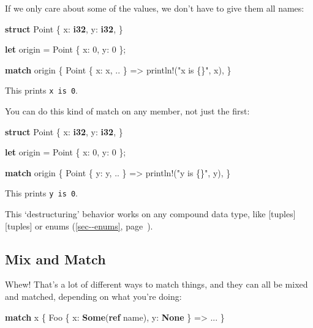 \documentclass[a4paper,]{book}
\renewcommand*{\hyperref}[2][\ar]{%
  \def\ar{#2}%
  #2 (\autoref{#1}, page~\pageref{#1})}
\newenvironment{Shaded}{\begin{snugshade}}{\end{snugshade}}
\newcommand{\KeywordTok}[1]{\textcolor[rgb]{0.13,0.29,0.53}{\textbf{{#1}}}}
\newcommand{\DecValTok}[1]{\textcolor[rgb]{0.00,0.00,0.81}{{#1}}}
\newcommand{\StringTok}[1]{\textcolor[rgb]{0.31,0.60,0.02}{{#1}}}
\newcommand{\OtherTok}[1]{\textcolor[rgb]{0.56,0.35,0.01}{{#1}}}
\newcommand{\NormalTok}[1]{{#1}}
\begin{document}
If we only care about some of the values, we don't have to give them all
names:

\begin{Shaded}
\begin{Highlighting}[]
\KeywordTok{struct} \NormalTok{Point \{}
    \NormalTok{x: }\KeywordTok{i32}\NormalTok{,}
    \NormalTok{y: }\KeywordTok{i32}\NormalTok{,}
\NormalTok{\}}

\KeywordTok{let} \NormalTok{origin = Point \{ x: }\DecValTok{0}\NormalTok{, y: }\DecValTok{0} \NormalTok{\};}

\KeywordTok{match} \NormalTok{origin \{}
    \NormalTok{Point \{ x: x, .. \} => }\OtherTok{println!}\NormalTok{(}\StringTok{"x is \{\}"}\NormalTok{, x),}
\NormalTok{\}}
\end{Highlighting}
\end{Shaded}

This prints \texttt{x\ is\ 0}.

You can do this kind of match on any member, not just the first:

\begin{Shaded}
\begin{Highlighting}[]
\KeywordTok{struct} \NormalTok{Point \{}
    \NormalTok{x: }\KeywordTok{i32}\NormalTok{,}
    \NormalTok{y: }\KeywordTok{i32}\NormalTok{,}
\NormalTok{\}}

\KeywordTok{let} \NormalTok{origin = Point \{ x: }\DecValTok{0}\NormalTok{, y: }\DecValTok{0} \NormalTok{\};}

\KeywordTok{match} \NormalTok{origin \{}
    \NormalTok{Point \{ y: y, .. \} => }\OtherTok{println!}\NormalTok{(}\StringTok{"y is \{\}"}\NormalTok{, y),}
\NormalTok{\}}
\end{Highlighting}
\end{Shaded}

This prints \texttt{y\ is\ 0}.

This `destructuring' behavior works on any compound data type, like
{[}tuples{]}{[}tuples{]} or \hyperref[sec--enums]{enums}.

\subsection{Mix and Match}\label{mix-and-match}

Whew! That's a lot of different ways to match things, and they can all
be mixed and matched, depending on what you're doing:

\begin{Shaded}
\begin{Highlighting}[]
\KeywordTok{match} \NormalTok{x \{}
    \NormalTok{Foo \{ x: }\KeywordTok{Some}\NormalTok{(}\KeywordTok{ref} \NormalTok{name), y: }\KeywordTok{None} \NormalTok{\} => ...}
\NormalTok{\}}
\end{Highlighting}
\end{Shaded}
\end{document}
